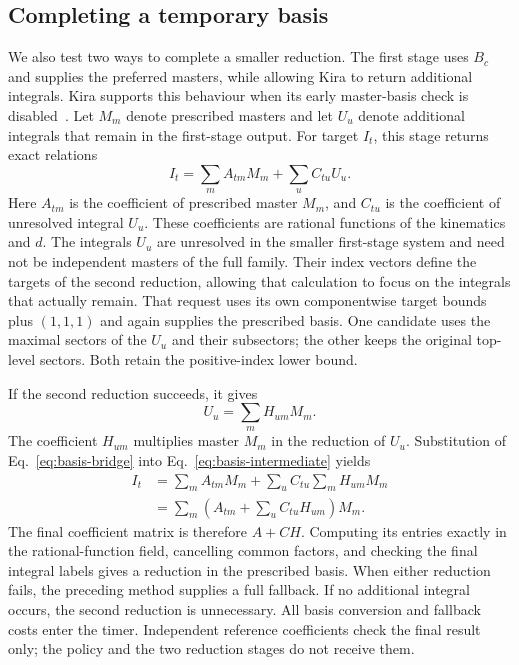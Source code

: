 \subsection{Completing a temporary basis}
We also test two ways to complete a smaller reduction. The first stage
uses $B_c$ and supplies the preferred masters, while allowing Kira to
return additional integrals. Kira supports this behaviour when its early
master-basis check is disabled~\cite{Kira3}. Let $M_m$ denote prescribed
masters and let $U_u$ denote additional integrals that remain in the
first-stage output. For target $I_t$, this stage returns exact relations
\begin{equation}
 I_t=\sum_m A_{tm}M_m+\sum_u C_{tu}U_u.
 \label{eq:basis-intermediate}
\end{equation}
Here $A_{tm}$ is the coefficient of prescribed master $M_m$, and
$C_{tu}$ is the coefficient of unresolved integral $U_u$. These
coefficients are rational functions of the kinematics and $d$.
The integrals $U_u$ are unresolved in the smaller first-stage system and need not be independent masters of the full family. Their index vectors define the targets of the second reduction, allowing that calculation to focus on the integrals that actually remain. That request uses its own componentwise target bounds
plus $(1,1,1)$ and again supplies the prescribed basis. One candidate uses
the maximal sectors of the $U_u$ and their subsectors; the other keeps the
original top-level sectors. Both retain the positive-index lower bound.

If the second reduction succeeds, it gives
\begin{equation}
 U_u=\sum_m H_{um}M_m.
 \label{eq:basis-bridge}
\end{equation}
The coefficient $H_{um}$ multiplies master $M_m$ in the reduction of $U_u$.
Substitution of Eq.~\eqref{eq:basis-bridge} into
Eq.~\eqref{eq:basis-intermediate} yields
\begin{align}
 I_t
 &=\sum_m A_{tm}M_m+\sum_u C_{tu}\sum_mH_{um}M_m\\
 &=\sum_m\left(A_{tm}+\sum_uC_{tu}H_{um}\right)M_m.
 \label{eq:basis-compose}
\end{align}
The final coefficient matrix is therefore $A+CH$. Computing its entries exactly in the rational-function field, cancelling common factors, and checking the final integral labels gives a reduction in the prescribed basis. When either reduction fails, the preceding method supplies a full
fallback. If no additional integral occurs, the second reduction is
unnecessary. All basis conversion and fallback costs enter the timer.
Independent reference coefficients check the final result only; the
policy and the two reduction stages do not receive them.

